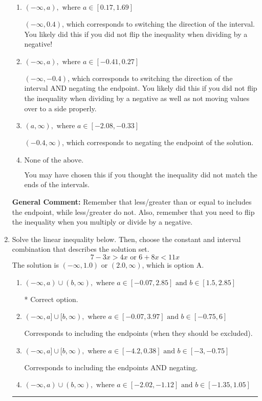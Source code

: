 \documentclass{extbook}[14pt]
\newcommand{\litem}[1]{\item #1

\rule{\textwidth}{0.4pt}}
\begin{document}
\begin{enumerate}
{\begin{enumerate}[label=\Alph*.]
* $(0.4, \infty)$, which is the correct option.
\item \( (-\infty, a), \text{ where } a \in [0.17, 1.69] \)

 $(-\infty, 0.4)$, which corresponds to switching the direction of the interval. You likely did this if you did not flip the inequality when dividing by a negative!
\item \( (-\infty, a), \text{ where } a \in [-0.41, 0.27] \)

 $(-\infty, -0.4)$, which corresponds to switching the direction of the interval AND negating the endpoint. You likely did this if you did not flip the inequality when dividing by a negative as well as not moving values over to a side properly.
\item \( (a, \infty), \text{ where } a \in [-2.08, -0.33] \)

 $(-0.4, \infty)$, which corresponds to negating the endpoint of the solution.
\item \( \text{None of the above}. \)

You may have chosen this if you thought the inequality did not match the ends of the intervals.
\end{enumerate}

\textbf{General Comment:} Remember that less/greater than or equal to includes the endpoint, while less/greater do not. Also, remember that you need to flip the inequality when you multiply or divide by a negative.
}
\litem{
Solve the linear inequality below. Then, choose the constant and interval combination that describes the solution set.
\[ 7 - 3 x > 4 x \text{ or } 6 + 8 x < 11 x \]The solution is \( (-\infty, 1.0) \text{ or } (2.0, \infty) \), which is option A.\begin{enumerate}[label=\Alph*.]
\item \( (-\infty, a) \cup (b, \infty), \text{ where } a \in [-0.07, 2.85] \text{ and } b \in [1.5, 2.85] \)

 * Correct option.
\item \( (-\infty, a] \cup [b, \infty), \text{ where } a \in [-0.07, 3.97] \text{ and } b \in [-0.75, 6] \)

Corresponds to including the endpoints (when they should be excluded).
\item \( (-\infty, a] \cup [b, \infty), \text{ where } a \in [-4.2, 0.38] \text{ and } b \in [-3, -0.75] \)

Corresponds to including the endpoints AND negating.
\item \( (-\infty, a) \cup (b, \infty), \text{ where } a \in [-2.02, -1.12] \text{ and } b \in [-1.35, 1.05] \)


\end{enumerate}}
\end{enumerate}
\end{document}
